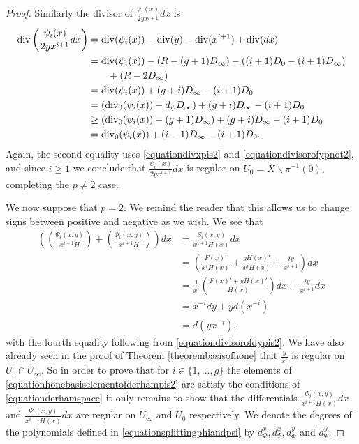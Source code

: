 \begin{proof}
    Similarly the divisor of $\frac{\psi_i(x)}{2yx^{i+1}}dx$ is
        \begin{align*}
        \operatorname{div} \left( \frac{\psi_i(x)}{2yx^{i+1}}dx\right) & =  \operatorname{div}(\psi_i(x)) - \operatorname{div}(y) - \operatorname{div}(x^{i+1}) + \operatorname{div} (dx) \\
        & =  \operatorname{div} (\psi_i(x) ) -(R - (g+1)D_\infty) - ((i+1)D_0 - (i+1)D_\infty) \\ 
        & \qquad + (R -2D_\infty) \\
        & =  \operatorname{div}(\psi_i(x)) + (g+i)D_\infty -(i+1)D_0 \\
        & =  (\operatorname{div}_0(\psi_i(x)) -d_\psi D_\infty) + (g+i)D_\infty -(i+1)D_0 \\
        & \geq \left( \operatorname{div}_0(\psi_i(x)) - (g+1)D_\infty \right) + (g+i)D_\infty -(i+1)D_0 \\
        & =  \operatorname{div}_0(\psi_i(x)) + (i-1)D_\infty - (i+1)D_0.
        \end{align*}
    Again, the second equality uses \eqref{equationdivxpis2} and \eqref{equationdivisorofypnot2}, and since $i\geq 1$ we conclude that $\frac{\psi_i(x)}{2yx^{i+1}}dx$ is regular on $U_0 = X \backslash \pi^{-1}(0)$, completing the $p\neq 2$ case.
    
    
    We now suppose that $p=2$.
    We remind the reader that this allows us to change signs between positive and negative as we wish.
    We see that
        \begin{align*}
        \left( \left( \frac{ \Psi_i(x,y)}{x^{i+1}H} \right) + \left( \frac{\Phi_i(x,y)}{x^{i+1}H} \right) \right) dx & =  \frac{S_i(x,y)}{x^{i+1}H(x)}dx \\
        & =  \left( \frac{F(x)'}{x^iH(x)} + \frac{yH(x)'}{x^iH(x)} + \frac{iy}{x^{i+1}} \right) dx \\
        & =  \frac{1}{x^i}\left( \frac{F(x)' + yH(x)'}{H(x)} \right) dx + \frac{iy}{x^{i+1}}dx \\
        & =  x^{-i}dy + yd \left( x^{-i}\right) \\
        & =  d\left( yx^{-i}\right),
        \end{align*}
    with the fourth equality following from \eqref{equationdivisorofdypis2}.
    We have also already seen in the proof of Theorem \ref{theorembasisofhone} that $\frac{y}{x^i}$ is regular on $U_0 \cap U_\infty$.
    So in order to prove that for $i\in \{1, \ldots, g\}$ the elements of \eqref{equationhonebasiselementofderhampis2} are satisfy the conditions of \eqref{equationderhamspace} it only remains to show that the differentials $\frac{\Phi_i(x,y)}{x^{i+1}H(x)}dx$ and $\frac{\Psi_i(x,y)}{x^{i+1}H(x)}dx$ are regular on $U_\infty$ and $U_0$ respectively.
    We denote the degrees of the polynomials defined in \eqref{equationsplittingphiandpsi} by $d_{\Phi}^x, d_{\Psi}^x, d_{\Phi}^y$ and $d_{\Psi}^y$.
    

\end{proof}
